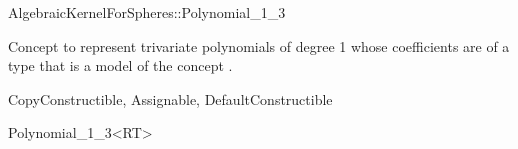 \begin{ccRefConcept}{AlgebraicKernelForSpheres::Polynomial_1_3}

\ccDefinition

Concept to represent trivariate polynomials of degree 1 whose
coefficients are of a type that is a model of the concept
.

\ccRefines
CopyConstructible, Assignable, DefaultConstructible






\ccHasModels


\ccSeeAlso


\end{ccRefConcept}
\begin{ccRefClass}{Polynomial_1_3<RT>}


\ccIsModel


\end{ccRefClass}
